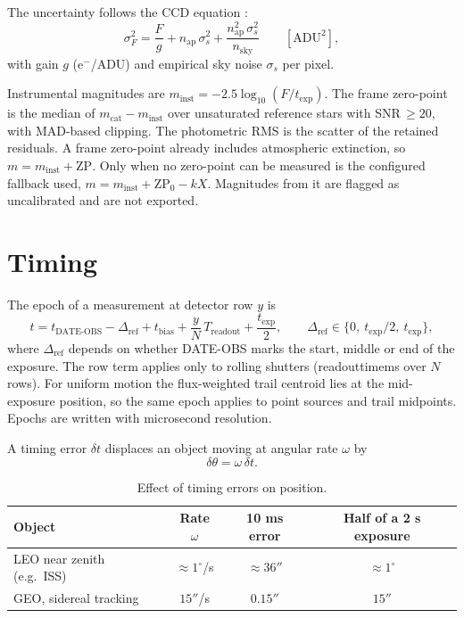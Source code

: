 \documentclass[11pt,a4paper]{article}
\newcommand{\brkus}{\textunderscore\allowbreak}
\newcommand{\code}[1]{{\ttfamily\let\_\brkus #1}}
\begin{document}
The uncertainty follows the CCD equation \cite{merline1995}:
\begin{equation}
\sigma_F^2 = \frac{F}{g} + n_\mathrm{ap}\,\sigma_s^2 + \frac{n_\mathrm{ap}^2\,\sigma_s^2}{n_\mathrm{sky}}
\qquad[\mathrm{ADU}^2],
\end{equation}
with gain $g$ (e$^-$/ADU) and empirical sky noise $\sigma_s$ per pixel.

Instrumental magnitudes are $m_\mathrm{inst} = -2.5\log_{10}(F/t_\mathrm{exp})$. The frame
zero-point is the median of $m_\mathrm{cat} - m_\mathrm{inst}$ over unsaturated reference stars
with SNR\,$\geq20$, with MAD-based clipping. The photometric RMS is the scatter of the retained
residuals. A frame zero-point already includes atmospheric extinction, so
$m = m_\mathrm{inst} + \mathrm{ZP}$. Only when no zero-point can be measured is the configured
fallback used, $m = m_\mathrm{inst} + \mathrm{ZP}_0 - kX$. Magnitudes from it are flagged as
uncalibrated and are not exported.

\section{Timing}\label{sec:timing}

The epoch of a measurement at detector row $y$ is
\begin{equation}
t = t_\mathrm{DATE\text{-}OBS} - \Delta_\mathrm{ref} + t_\mathrm{bias} + \frac{y}{N}\,T_\mathrm{readout} + \frac{t_\mathrm{exp}}{2},
\qquad \Delta_\mathrm{ref}\in\{0,\ t_\mathrm{exp}/2,\ t_\mathrm{exp}\},
\end{equation}
where $\Delta_\mathrm{ref}$ depends on whether DATE-OBS marks the start, middle or end of the
exposure. The row term applies only to rolling shutters (\code{readout\_time\_ms} over $N$
rows). For uniform motion the flux-weighted trail centroid lies at the mid-exposure position, so
the same epoch applies to point sources and trail midpoints. Epochs are written with
microsecond resolution.

A timing error $\delta t$ displaces an object moving at angular rate $\omega$ by
\begin{equation}
\delta\theta = \omega\,\delta t .
\end{equation}

\begin{table}[H]
\centering\small
\begin{tabular}{@{}lccc@{}}
\toprule
\textbf{Object} & \textbf{Rate $\omega$} & \textbf{10 ms error} & \textbf{Half of a 2 s exposure} \\
\midrule
LEO near zenith (e.g.\ ISS) & $\approx1^\circ$/s & $\approx36''$ & $\approx1^\circ$ \\
GEO, sidereal tracking & $15''$/s & $0.15''$ & $15''$ \\
\bottomrule
\end{tabular}
\caption{Effect of timing errors on position.}
\end{table}
\end{document}
